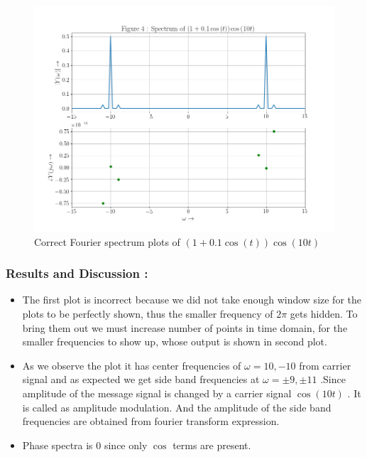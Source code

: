 \documentclass[11pt, a4paper]{article}
\begin{document}
\begin{figure}[!tbh]
\includegraphics[scale=0.5]{./../Extras/fig9-4.png}  %
\caption{Correct Fourier spectrum plots of $\left(1+0.1\cos\left(t\right)\right)\cos\left(10t\right)$}
\end{figure}
\newpage
\subsubsection{Results and Discussion :}\label{results-and-discussion}

\begin{itemize}
\item
  The first plot is incorrect because we did not take enough window size for the plots to be perfectly shown, thus the smaller frequency of \(2\pi\) gets
  hidden. To bring them out we must increase number of points in time domain, for the smaller frequencies to show up, whose output is shown in second plot.

\item
  As we observe the plot it has center frequencies of
  \(\omega = 10,-10\) from carrier signal and as expected we get side band frequencies at \(\omega = \pm 9 , \pm 11 \) .Since amplitude of
  the message signal is changed by a carrier signal \(\cos(10t)\) . It
  is called as amplitude modulation. And the amplitude of the side band
  frequencies are obtained from fourier transform expression.
\item
  Phase spectra is 0 since only \(\cos \) terms are present.
\end{itemize}	
\newpage
\end{document}
